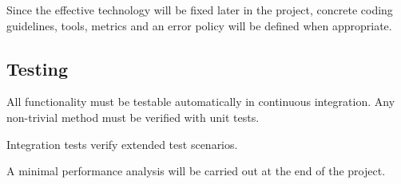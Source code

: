 \documentclass[a4paper]{article}
\begin{document}
Since the effective technology will be fixed later in the project, concrete coding guidelines, tools, metrics and an error policy will be defined when appropriate.


\subsection{Testing}
All functionality must be testable automatically in continuous integration. Any non-trivial method must be verified with unit tests.

Integration tests verify extended test scenarios.

A minimal performance analysis will be carried out at the end of the project.



\end{document}
